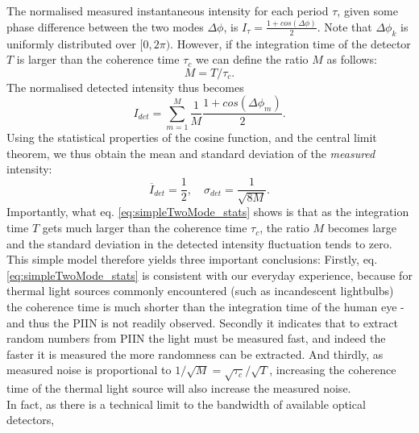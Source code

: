 \documentclass[]{article}
\newcommand*\mean[1]{\overline{#1}}
\begin{document}
	The normalised measured instantaneous intensity for each period $\tau$, given some phase difference between the two modes $\Delta \phi$, is $I_{\tau} = \frac{1+cos(\Delta \phi)}{2}$. Note that $\Delta \phi_k$ is uniformly distributed over $[0,2\pi)$. However, if the integration time of the detector $T$ is larger than the coherence time $\tau_c$ we can define the ratio $M$ as follows:
		\begin{equation}
		M = T/\tau_c.
		\end{equation}
	The normalised detected intensity thus becomes
		\begin{equation}
		I_{det} = \sum_{m=1}^M \frac{1}{M} \frac{1+cos(\Delta \phi_m)}{2}.
		\end{equation}
	Using the statistical properties of the cosine function, and the central limit theorem, we thus obtain the mean and standard deviation of the \textit{measured} intensity:
		\begin{equation}
		\mean{I}_{det} = \frac{1}{2}, \quad \sigma_{det} = \frac{1}{\sqrt{8M}} \label{eq:simpleTwoMode_stats}.
		\end{equation}
	Importantly, what eq. \ref{eq:simpleTwoMode_stats} shows is that as the integration time $T$ gets much larger than the coherence time $\tau_c$, the ratio $M$ becomes large and the standard deviation in the detected intensity fluctuation tends to zero. This simple model therefore yields three important conclusions: Firstly, eq. \ref{eq:simpleTwoMode_stats} is consistent with our everyday experience, because for thermal light sources commonly encountered (such as incandescent lightbulbs) the coherence time is much shorter than the integration time of the human eye - and thus the PIIN is not readily observed. Secondly it indicates that to extract random numbers from PIIN the light must be measured fast, and indeed the faster it is measured the more randomness can be extracted. And thirdly, as measured noise is proportional to $1/\sqrt{M} = \sqrt{\tau_c}/\sqrt{T}$, increasing the coherence time of the thermal light source will also increase the measured noise.\\
	In fact, as there is a technical limit to the bandwidth of available optical detectors,




\end{document}
